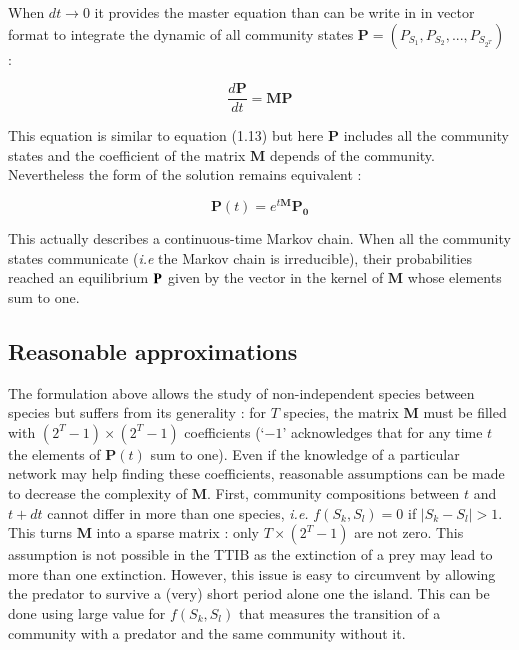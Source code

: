 When \(dt \rightarrow 0\) it provides the master equation than can be
write in in vector format to integrate the dynamic of all community
states \(\mathbf{P}=(P_{S_1}, P_{S_2}, ..., P_{S_{2^T}})\) :

\begin{equation}
\frac{d\mathbf{P}}{dt} = \mathbf{M}\mathbf{P}
\end{equation}

This equation is similar to equation (1.13) but here \(\mathbf{P}\)
includes all the community states and the coefficient of the matrix
\(\mathbf{M}\) depends of the community. Nevertheless the form of the
solution remains equivalent :

\begin{equation}
\mathbf{P}(t) = e^{t\mathbf{M}}\mathbf{P_0}
\end{equation}

This actually describes a continuous-time Markov chain. When all the
community states communicate (\emph{i.e} the Markov chain is
irreducible), their probabilities reached an equilibrium
\(\mathbf{P}^{\*}\) given by the vector in the kernel of \(\mathbf{M}\)
whose elements sum to one.

\subsection{Reasonable approximations}\label{reasonable-approximations}

The formulation above allows the study of non-independent species
between species but suffers from its generality : for \(T\) species, the
matrix \(\mathbf{M}\) must be filled with \((2^T-1) \times (2^T-1)\)
coefficients (`\(-1\)' acknowledges that for any time \(t\) the elements
of \(\mathbf{P}(t)\) sum to one). Even if the knowledge of a particular
network may help finding these coefficients, reasonable assumptions can
be made to decrease the complexity of \(\mathbf{M}\). First, community
compositions between \(t\) and \(t+dt\) cannot differ in more than one
species, \emph{i.e.} \(f(S_k,S_l)=0\) if \(|S_k-S_l|>1\). This turns
\(\mathbf{M}\) into a sparse matrix : only \(T \times (2^T-1)\) are not
zero. This assumption is not possible in the TTIB as the extinction of a
prey may lead to more than one extinction. However, this issue is easy
to circumvent by allowing the predator to survive a (very) short period
alone one the island. This can be done using large value for
\(f(S_k,S_l)\) that measures the transition of a community with a
predator and the same community without it.

